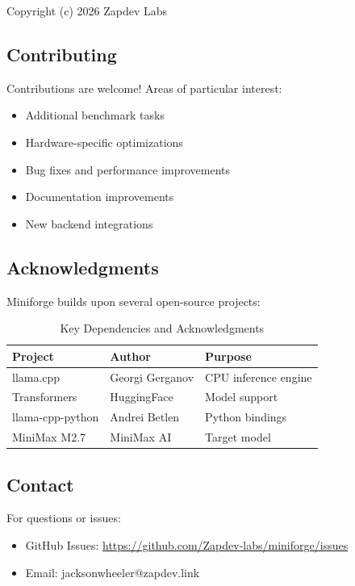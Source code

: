 Copyright (c) 2026 Zapdev Labs

\subsection{Contributing}

Contributions are welcome! Areas of particular interest:

\begin{itemize}
    \item Additional benchmark tasks
    \item Hardware-specific optimizations
    \item Bug fixes and performance improvements
    \item Documentation improvements
    \item New backend integrations
\end{itemize}

\subsection{Acknowledgments}

Miniforge builds upon several open-source projects:

\begin{table}[h]
\centering
\caption{Key Dependencies and Acknowledgments}
\label{tab:dependencies}
\begin{tabular}{lll}
\toprule
\textbf{Project} & \textbf{Author} & \textbf{Purpose} \\
\midrule
llama.cpp & Georgi Gerganov & CPU inference engine \\
Transformers & HuggingFace & Model support \\
llama-cpp-python & Andrei Betlen & Python bindings \\
MiniMax M2.7 & MiniMax AI & Target model \\
\bottomrule
\end{tabular}
\end{table}

\subsection{Contact}

For questions or issues:

\begin{itemize}
    \item GitHub Issues: \url{https://github.com/Zapdev-labs/miniforge/issues}
    \item Email: jacksonwheeler@zapdev.link
\end{itemize}

